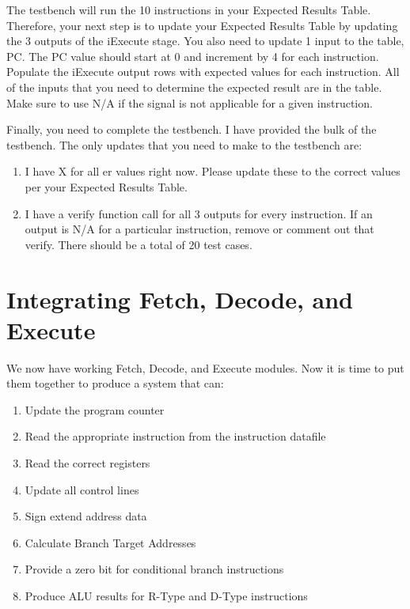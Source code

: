 The testbench will run the 10 instructions in your Expected Results Table.  Therefore, your next step is to update your Expected Results Table by updating the 3 outputs of the iExecute stage. You also need to update 1 input to the table, PC.  The PC value should start at 0 and increment by 4 for each instruction.  Populate the iExecute output rows with expected values for each instruction.  All of the inputs that you need to determine the expected result are in the table.  Make sure to use N/A if the signal is not applicable for a given instruction.

Finally, you need to complete the testbench.  I have provided the bulk of the testbench.  The only updates that you need to make to the testbench are:
\begin{enumerate}
	\item I have X for all er values right now.  Please update these to the correct values per your Expected Results Table.
	\item I have a verify function call for all 3 outputs for every instruction.  If an output is N/A for a particular instruction, remove or comment out that verify.  There should be a total of 20 test cases.  
\end{enumerate}   


\section{Integrating Fetch, Decode, and Execute}
We now have working Fetch, Decode, and Execute modules.  Now it is time to put them together to produce a system that can:
\begin{enumerate}
	\item Update the program counter
	\item Read the appropriate instruction from the instruction datafile
	\item Read the correct registers
	\item Update all control lines
	\item Sign extend address data
	\item Calculate Branch Target Addresses
	\item Provide a zero bit for conditional branch instructions
	\item Produce ALU results for R-Type and D-Type instructions
\end{enumerate}

